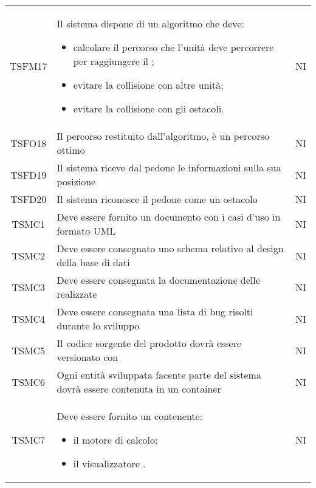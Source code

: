 \begin{longtable}[h!] { c  m{12cm} c}
		TSFM17  & Il sistema dispone di un algoritmo che deve:
				\begin{itemize}
					\item calcolare il percorso che l'unità deve percorrere per raggiungere il \glock{POI};
					\item evitare la collisione con altre unità;
					\item evitare la collisione con gli ostacoli.
				\end{itemize}		
										& NI \\
		
		TSFO18  & Il percorso restituito dall'algoritmo, è un percorso ottimo & NI\\
		
		TSFD19 & Il sistema riceve dal pedone le informazioni sulla sua posizione & NI\\

		TSFD20  & Il sistema riconosce il pedone come un ostacolo & NI \\
		\hline
		
		TSMC1   & Deve essere fornito un documento con i casi d'uso in formato UML & NI \\
		
		TSMC2   & Deve essere consegnato uno schema relativo al design della base di dati & NI \\
		
		TSMC3  &Deve essere consegnata la documentazione delle \glock{API} realizzate & NI\\
		
		TSMC4   & Deve essere consegnata una lista di bug risolti durante lo sviluppo & NI\\
		
		TSMC5   & Il codice sorgente del prodotto dovrà essere versionato con \glock{GitHub} & NI\\
		
		TSMC6   & Ogni entità sviluppata facente parte del sistema dovrà essere contenuta in un container \glock{Docker} & NI \\
		
		TSMC7   & Deve essere fornito un \glock{Dockerfile} contenente:
						\begin{itemize}
							\item il motore di calcolo;
							\item il visualizzatore \glock{Real-Time}.
						\end{itemize} 
											& NI \\
											

\end{longtable}
